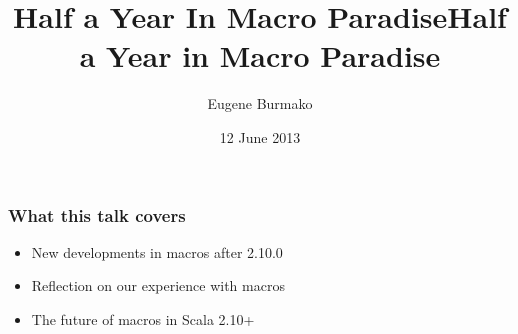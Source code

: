 \documentclass[svgnames,hyperref={bookmarks=false}]{beamer}
\title{Half a Year In Macro Paradise}
\begin{document}
\title{Half a Year in Macro Paradise}
\author{Eugene Burmako}
\date{12 June 2013}
{
\begin{frame}
  \titlepage
\end{frame}
}

\begin{frame}[fragile]
\frametitle{What this talk covers}

\begin{itemize}
\item New developments in macros after 2.10.0
\item Reflection on our experience with macros
\item The future of macros in Scala 2.10+
\end{itemize}
\end{frame}
\end{document}
